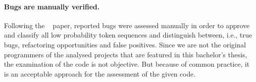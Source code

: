 \paragraph{Bugs are manually verified.}
Following the \bugram{}~\cite{bugram} paper, reported bugs were assessed manually in order to approve and classify all low probability token sequences and distinguish between, i.e., true bugs, refactoring opportunities and false positives. Since we are not the original programmers of the analysed projects that are featured in this bachelor's thesis, the examination of the code is not objective. But because of common practice, it is an acceptable approach for the assessment of the given code.


